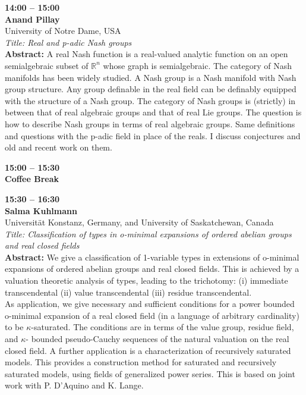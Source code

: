 \documentclass[10pt,a4paper]{article}
\begin{document}
\begin{tcolorbox}[talkbox]
\textbf{14:00 -- 15:00} \\
\textbf{Anand Pillay} \\
University of Notre Dame, USA \\
\textit{Title: Real and p-adic Nash groups} \\
\textbf{Abstract:} A real Nash function is a real-valued analytic function on an open semialgebraic subset of $\mathbb{R}^n$ whose graph is semialgebraic. The category of Nash manifolds has been widely studied. A Nash group is a Nash manifold with Nash group structure. Any group definable in the real field can be definably equipped with the structure of a Nash group. The category of Nash groups is (strictly) in between that of real algebraic groups and that of real Lie groups. The question is how to describe Nash groups in terms of real algebraic groups. Same definitions and questions with the p-adic field in place of the reals. I discuss conjectures and old and recent work on them.
\end{tcolorbox}
\begin{tcolorbox}[talkbox]
\textbf{15:00 -- 15:30} \\
\textbf{Coffee Break}
\end{tcolorbox}
\begin{tcolorbox}[talkbox]
\textbf{15:30 -- 16:30} \\
\textbf{Salma Kuhlmann} \\
Universität Konstanz, Germany, and University of Saskatchewan, Canada \\
\textit{Title: Classification of types in o-minimal expansions of ordered abelian groups and real closed fields} \\
\textbf{Abstract:} We give a classification of 1-variable types in extensions of o-minimal expansions of ordered abelian groups and real closed fields. This is achieved by a valuation theoretic  analysis of types, leading to the trichotomy: (i) immediate transcendental (ii) value transcendental (iii) residue transcendental. \\
						
As application, we give necessary and sufficient conditions for a power bounded o-minimal expansion of a real closed field (in a language of arbitrary cardinality) to be $\kappa$-saturated. The conditions are in terms of the value group, residue field, and  $\kappa$- bounded pseudo-Cauchy sequences of the natural valuation on the real closed field. A further application is a characterization of recursively saturated models. This provides a construction method for saturated and recursively saturated models, using fields of generalized power series. This is based on joint work with P. D'Aquino and K. Lange.
\end{tcolorbox}
\end{document}
